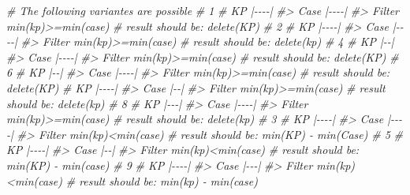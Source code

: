 \documentclass[
]{article}
\newenvironment{Shaded}{\begin{snugshade}}{\end{snugshade}}
\newcommand{\CommentTok}[1]{\textcolor[rgb]{0.56,0.35,0.01}{\textit{#1}}}
\begin{document}
\begin{Shaded}
\begin{Highlighting}[]
\CommentTok{\# The following variantes are possible}
\CommentTok{\# 1 }
\CommentTok{\# KP   |{-}{-}{-}{-}|}
\CommentTok{\#\textgreater{} Case |{-}{-}{-}{-}|}
\CommentTok{\#\textgreater{} Filter min(kp)\textgreater{}=min(case)}
\CommentTok{\# result should be:  delete(KP)}
\CommentTok{\# 2}
\CommentTok{\# KP      |{-}{-}{-}{-}|}
\CommentTok{\#\textgreater{} Case |{-}{-}{-}{-}|}
\CommentTok{\#\textgreater{} Filter min(kp)\textgreater{}=min(case)}
\CommentTok{\# result should be: delete(kp)}
\CommentTok{\# 4}
\CommentTok{\# KP    |{-}{-}|}
\CommentTok{\#\textgreater{} Case |{-}{-}{-}{-}|}
\CommentTok{\#\textgreater{} Filter min(kp)\textgreater{}=min(case)}
\CommentTok{\# result should be:  delete(KP) }
\CommentTok{\# 6}
\CommentTok{\# KP   |{-}{-}|}
\CommentTok{\#\textgreater{} Case |{-}{-}{-}{-}|}
\CommentTok{\#\textgreater{} Filter min(kp)\textgreater{}=min(case)}
\CommentTok{\# result should be: delete(KP)}
\CommentTok{\# KP   |{-}{-}{-}{-}|}
\CommentTok{\#\textgreater{} Case |{-}{-}|}
\CommentTok{\#\textgreater{} Filter min(kp)\textgreater{}=min(case) }
\CommentTok{\# result should be: delete(kp)}
\CommentTok{\# 8}
\CommentTok{\# KP    |{-}{-}{-}|}
\CommentTok{\#\textgreater{} Case |{-}{-}{-}{-}|}
\CommentTok{\#\textgreater{} Filter min(kp)\textgreater{}=min(case)}
\CommentTok{\# result should be: delete(kp)}
\CommentTok{\# 3}
\CommentTok{\# KP   |{-}{-}{-}{-}|}
\CommentTok{\#\textgreater{} Case    |{-}{-}{-}{-}|}
\CommentTok{\#\textgreater{} Filter min(kp)\textless{}min(case)}
\CommentTok{\# result should be:  min(KP) {-} min(Case)}
\CommentTok{\# 5}
\CommentTok{\# KP   |{-}{-}{-}{-}|}
\CommentTok{\#\textgreater{} Case  |{-}{-}|}
\CommentTok{\#\textgreater{} Filter min(kp)\textless{}min(case)}
\CommentTok{\# result should be: min(KP) {-} min(case)}
\CommentTok{\# 9}
\CommentTok{\# KP   |{-}{-}{-}{-}|}
\CommentTok{\#\textgreater{} Case  |{-}{-}{-}|}
\CommentTok{\#\textgreater{} Filter min(kp)\textless{}min(case)}
\CommentTok{\# result should be: min(kp) {-} min(case)}




\end{Highlighting}
\end{Shaded}
\end{document}
